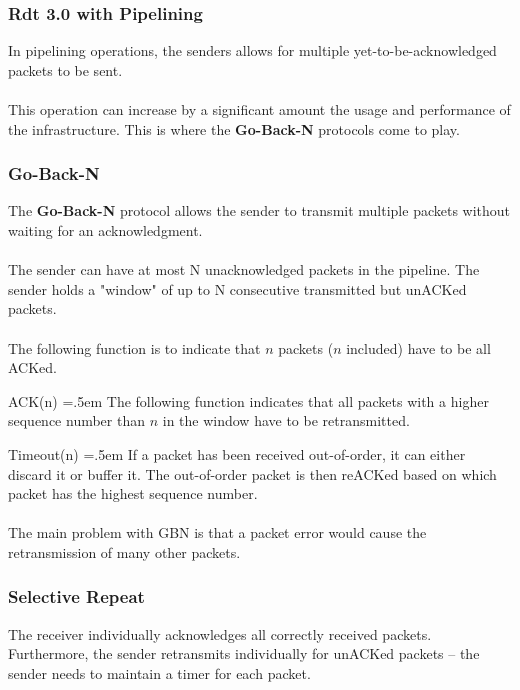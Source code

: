 \documentclass{article}
\newenvironment{cverbatim}
 {\SaveVerbatim{cverb}}
 {\endSaveVerbatim
  \flushleft\fboxrule=0pt\fboxsep=.5em
  \colorbox{cverbbg}{\BUseVerbatim{cverb}}%
  \endflushleft
}
\begin{document}
\subsubsection{Rdt 3.0 with Pipelining}
In pipelining operations, the senders allows for multiple yet-to-be-acknowledged packets to be sent. \\ \\
This operation can increase by a significant amount the usage and performance of the infrastructure. This is where the \textbf{Go-Back-N} protocols come to play.

\subsubsection{Go-Back-N}
The \textbf{Go-Back-N} protocol allows the sender to transmit multiple packets without waiting for an acknowledgment. \\ \\
The sender can have at most N unacknowledged packets in the pipeline. The sender holds a "window" of up to N consecutive transmitted but unACKed packets. \\ \\
The following function is to indicate that $n$ packets ($n$ included) have to be all ACKed.

\begin{cverbatim}
ACK(n)
\end{cverbatim}
The following function indicates that all packets with a higher sequence number than $n$ in the window have to be retransmitted.

\begin{cverbatim}
Timeout(n)
\end{cverbatim}
If a packet has been received out-of-order, it can either discard it or buffer it. The out-of-order packet is then reACKed based on which packet has the highest sequence number. \\ \\
The main problem with GBN is that a packet error would cause the retransmission of many other packets.

\subsubsection{Selective Repeat}
The receiver individually acknowledges all correctly received packets. Furthermore, the sender retransmits individually for unACKed packets -- the sender needs to maintain a timer for each packet.
\end{document}
